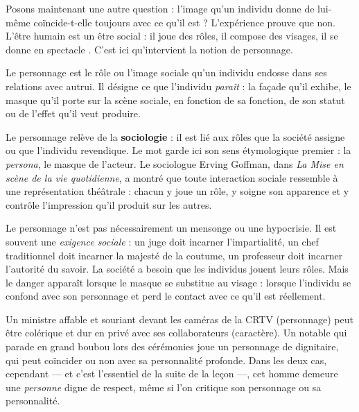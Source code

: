 \documentclass[11pt]{article}
\newcommand{\cle}[1]{{\popxbold\color{popdark}#1}}
\newcounter{popsec}
\newcounter{popsub}
\newcommand{\courssub}[1]{%
  \stepcounter{popsub}%
  \par\vspace{9pt}\noindent{\popxbold\fontsize{11.5}{13}\selectfont\color{popink}{\color{poporange}\thepopsec.\thepopsub}\hspace{6pt}#1}\par\nopagebreak\vspace{4pt}
}
\begin{document}
\courssub{Le personnage : ce que je parais}

Posons maintenant une autre question : l'image qu'un individu donne de lui-même coïncide-t-elle toujours avec ce qu'il est ? L'expérience prouve que non. L'être humain est un être social : il joue des rôles, il compose des visages, il \guillemotleft se donne en spectacle \guillemotright. C'est ici qu'intervient la notion de personnage.

\begin{definition}[Le personnage]
Le \cle{personnage} est le rôle ou l'image sociale qu'un individu endosse dans ses relations avec autrui. Il désigne ce que l'individu \emph{paraît} : la façade qu'il exhibe, le masque qu'il porte sur la scène sociale, en fonction de sa fonction, de son statut ou de l'effet qu'il veut produire.
\end{definition}

Le personnage relève de la \textbf{sociologie} : il est lié aux rôles que la société assigne ou que l'individu revendique. Le mot garde ici son sens étymologique premier : la \emph{persona}, le masque de l'acteur. Le sociologue Erving Goffman, dans \emph{La Mise en scène de la vie quotidienne}, a montré que toute interaction sociale ressemble à une représentation théâtrale : chacun y joue un rôle, y soigne son apparence et y contrôle l'impression qu'il produit sur les autres.

Le personnage n'est pas nécessairement un mensonge ou une hypocrisie. Il est souvent une \emph{exigence sociale} : un juge doit incarner l'impartialité, un chef traditionnel doit incarner la majesté de la coutume, un professeur doit incarner l'autorité du savoir. La société a besoin que les individus jouent leurs rôles. Mais le danger apparaît lorsque le masque se substitue au visage : lorsque l'individu se confond avec son personnage et perd le contact avec ce qu'il est réellement.

\begin{exemplebox}
Un ministre affable et souriant devant les caméras de la CRTV (personnage) peut être colérique et dur en privé avec ses collaborateurs (caractère). Un notable qui parade en grand boubou lors des cérémonies joue un personnage de dignitaire, qui peut coïncider ou non avec sa personnalité profonde. Dans les deux cas, cependant — et c'est l'essentiel de la suite de la leçon —, cet homme demeure une \emph{personne} digne de respect, même si l'on critique son personnage ou sa personnalité.
\end{exemplebox}
\end{document}
